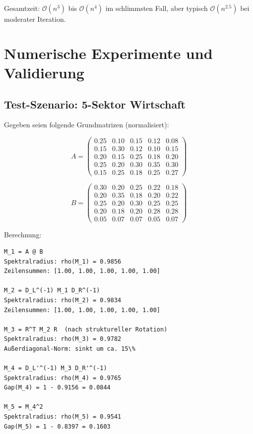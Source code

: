 \documentclass[a4paper,12pt]{article}
\theoremstyle{definition}
\begin{document}
Gesamtzeit: $\mathcal{O}(n^3)$ bis $\mathcal{O}(n^4)$ im schlimmsten Fall, aber typisch $\mathcal{O}(n^{2.5})$ bei moderater Iteration.

\section{Numerische Experimente und Validierung}

\subsection{Test-Szenario: 5-Sektor Wirtschaft}

Gegeben seien folgende Grundmatrizen (normalisiert):

\[
A = \begin{pmatrix}
0.25 & 0.10 & 0.15 & 0.12 & 0.08 \\
0.15 & 0.30 & 0.12 & 0.10 & 0.15 \\
0.20 & 0.15 & 0.25 & 0.18 & 0.20 \\
0.25 & 0.20 & 0.30 & 0.35 & 0.30 \\
0.15 & 0.25 & 0.18 & 0.25 & 0.27
\end{pmatrix}
\]

\[
B = \begin{pmatrix}
0.30 & 0.20 & 0.25 & 0.22 & 0.18 \\
0.20 & 0.35 & 0.18 & 0.20 & 0.22 \\
0.25 & 0.20 & 0.30 & 0.25 & 0.25 \\
0.20 & 0.18 & 0.20 & 0.28 & 0.28 \\
0.05 & 0.07 & 0.07 & 0.05 & 0.07
\end{pmatrix}
\]

Berechnung:

\begin{verbatim}
M_1 = A @ B
Spektralradius: rho(M_1) = 0.9856
Zeilensummen: [1.00, 1.00, 1.00, 1.00, 1.00]

M_2 = D_L^(-1) M_1 D_R^(-1)
Spektralradius: rho(M_2) = 0.9834
Zeilensummen: [1.00, 1.00, 1.00, 1.00, 1.00]

M_3 = R^T M_2 R  (nach struktureller Rotation)
Spektralradius: rho(M_3) = 0.9782
Außerdiagonal-Norm: sinkt um ca. 15\%

M_4 = D_L'^(-1) M_3 D_R'^(-1)
Spektralradius: rho(M_4) = 0.9765
Gap(M_4) = 1 - 0.9156 = 0.0844

M_5 = M_4^2
Spektralradius: rho(M_5) = 0.9541
Gap(M_5) = 1 - 0.8397 = 0.1603
\end{verbatim}
\end{document}

